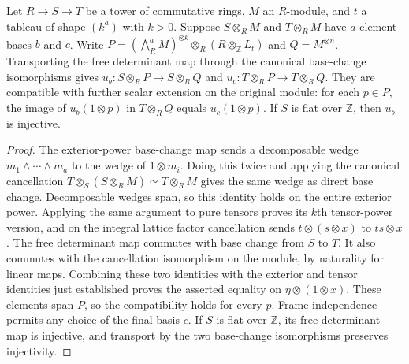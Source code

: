 \begin{lemma}
\label{lem:determinant-chart-tower}
\leanok
Let $R\to S\to T$ be a tower of commutative rings, $M$ an
$R$-module, and $t$ a tableau of shape $(k^a)$ with $k>0$.
Suppose $S\otimes_R M$ and $T\otimes_R M$ have $a$-element bases
$b$ and $c$. Write
$P=(\bigwedge_R^a M)^{\otimes k}\otimes_R(R\otimes_{\mathbb Z}L_t)$
and $Q=M^{\otimes n}$. Transporting the free determinant map through
the canonical base-change isomorphisms gives
$u_b:S\otimes_R P\to S\otimes_R Q$ and
$u_c:T\otimes_R P\to T\otimes_R Q$. They are compatible with
further scalar extension on the original module: for each $p\in P$,
the image of $u_b(1\otimes p)$ in $T\otimes_R Q$ equals
$u_c(1\otimes p)$. If $S$ is flat over $\mathbb Z$, then $u_b$
is injective.
\end{lemma}
\begin{proof}
The exterior-power base-change map sends a decomposable wedge
$m_1\wedge\cdots\wedge m_a$ to the wedge of $1\otimes m_i$.
Doing this twice and applying the canonical cancellation
$T\otimes_S(S\otimes_R M)\simeq T\otimes_R M$ gives the same
wedge as direct base change. Decomposable wedges span, so this
identity holds on the entire exterior power. Applying the same
argument to pure tensors proves its $k$th tensor-power version,
and on the integral lattice factor cancellation sends
$t\otimes(s\otimes x)$ to $ts\otimes x$.
The free determinant map commutes with base change from $S$ to $T$.
It also commutes with the cancellation isomorphism on the module,
by naturality for linear maps. Combining these two identities with
the exterior and tensor identities just established proves the
asserted equality on $\eta\otimes(1\otimes x)$.
These elements span $P$, so the compatibility holds for every $p$.
Frame independence permits any choice of the final basis $c$.
If $S$ is flat over $\mathbb Z$, its free determinant map is
injective, and transport by the two base-change isomorphisms
preserves injectivity.
\end{proof}

